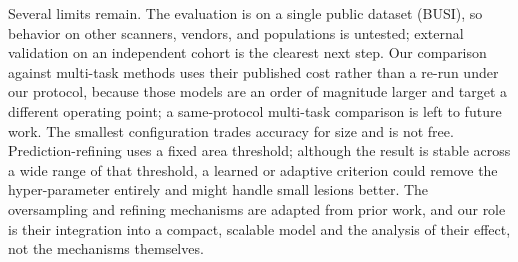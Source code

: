 \documentclass[runningheads]{llncs}
\begin{document}
Several limits remain. The evaluation is on a single public dataset (BUSI), so
behavior on other scanners, vendors, and populations is untested; external
validation on an independent cohort is the clearest next step. Our comparison
against multi-task methods uses their published cost rather than a re-run under
our protocol, because those models are an order of magnitude larger and target a
different operating point; a same-protocol multi-task comparison is left to future
work. The smallest configuration trades accuracy for size and is not free.
Prediction-refining uses a fixed area threshold; although the result is stable
across a wide range of that threshold, a learned or adaptive criterion could
remove the hyper-parameter entirely and might handle small lesions better. The
oversampling and refining mechanisms are adapted from prior work, and our role is
their integration into a compact, scalable model and the analysis of their effect,
not the mechanisms themselves.


\end{document}
